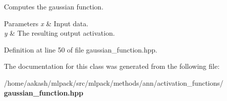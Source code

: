Computes the gaussian function. 


\begin{DoxyParams}{Parameters}
{\em x} & Input data. \\
\hline
{\em y} & The resulting output activation. \\
\hline
\end{DoxyParams}


Definition at line 50 of file gaussian\+\_\+function.\+hpp.



The documentation for this class was generated from the following file\+:\begin{DoxyCompactItemize}
\item 
/home/aakash/mlpack/src/mlpack/methods/ann/activation\+\_\+functions/\textbf{ gaussian\+\_\+function.\+hpp}\end{DoxyCompactItemize}
